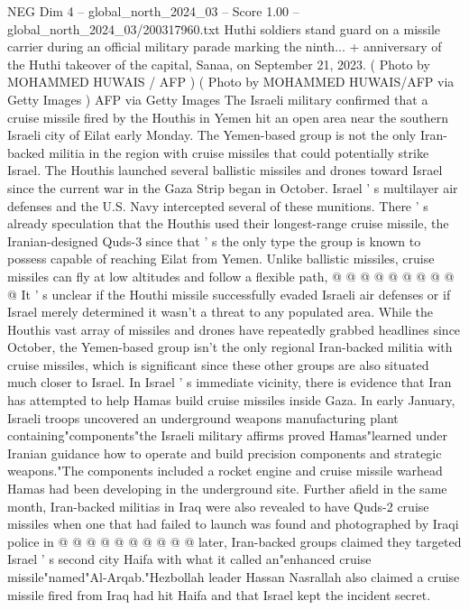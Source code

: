 \begin{textsample}{NEG Dim 4 – global\_north\_2024\_03 – Score 1.00 – global\_north\_2024\_03/200317960.txt}  \label{ex:f4_neg_220}
Huthi soldiers stand guard on a missile carrier during an official military parade marking the ninth... + anniversary of the Huthi takeover of the capital, Sanaa, on September 21, 2023. ( Photo by MOHAMMED HUWAIS / AFP ) ( Photo by MOHAMMED HUWAIS/AFP via Getty Images ) AFP via Getty Images The Israeli military confirmed that a cruise missile fired by the Houthis in Yemen hit an open area near the southern Israeli city of Eilat early Monday.
The Yemen-based group is not the only Iran-backed militia in the region with cruise missiles that could potentially strike Israel.
The Houthis launched several ballistic missiles and drones toward Israel since the current war in the Gaza Strip began in October.
Israel ' s multilayer air defenses and the U.S.
Navy intercepted several of these munitions.
There ' s already speculation that the Houthis used their longest-range cruise missile, the Iranian-designed Quds-3 since that ' s the only type the group is known to possess capable of reaching Eilat from Yemen.
Unlike ballistic missiles, cruise missiles can fly at low altitudes and follow a flexible path, @ @ @ @ @ @ @ @ @ @ It ' s unclear if the Houthi missile successfully evaded Israeli air defenses or if Israel merely determined it wasn't a threat to any populated area.
While the Houthis vast array of missiles and drones have repeatedly grabbed headlines since October, the Yemen-based group isn't the only regional Iran-backed militia with cruise missiles, which is significant since these other groups are also situated much closer to Israel.
In Israel ' s immediate vicinity, there is evidence that Iran has attempted to help Hamas build cruise missiles inside Gaza.
In early January, Israeli troops uncovered an underground weapons manufacturing plant containing"components"the Israeli military affirms proved Hamas"learned under Iranian guidance how to operate and build precision components and strategic weapons."The components included a rocket engine and cruise missile warhead Hamas had been developing in the underground site.
Further afield in the same month, Iran-backed militias in Iraq were also revealed to have Quds-2 cruise missiles when one that had failed to launch was found and photographed by Iraqi police in @ @ @ @ @ @ @ @ @ @ later, Iran-backed groups claimed they targeted Israel ' s second city Haifa with what it called an"enhanced cruise missile"named"Al-Arqab."Hezbollah leader Hassan Nasrallah also claimed a cruise missile fired from Iraq had hit Haifa and that Israel kept the incident secret.

\end{textsample}
